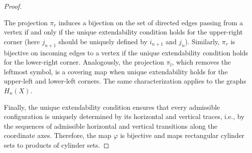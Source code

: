 \documentclass[10pt,a4paper]{amsart}
\begin{document}
\begin{proof}
\begin{center}
\end{center}
The projection $\pi_r$ induces a bijection on the set of directed edges passing from a vertex if and only if the unique extendability condition holds for the upper-right corner (here $j_{n+1}$ should be uniquely defined by $i_{n+1}$ and $j_n$). Similarly, $\pi_r$ is bijective on incoming edges to a vertex if the unique extendability condition holds for the lower-right corner. Analogously, the projection $\pi_l$, which removes the leftmost symbol, is a covering map when unique extendability holds for the upper-left and lower-left corners.  The same characterization applies to the graphs $H_n(X)$.

Finally, the unique extendability condition ensures that every admissible configuration is uniquely determined by its horizontal and vertical traces, i.e., by the sequences of admissible horizontal and vertical transitions along the coordinate axes. Therefore, the map $\varphi$ is bijective and maps rectangular cylinder sets to products of cylinder sets.
\end{proof}
\end{document}
